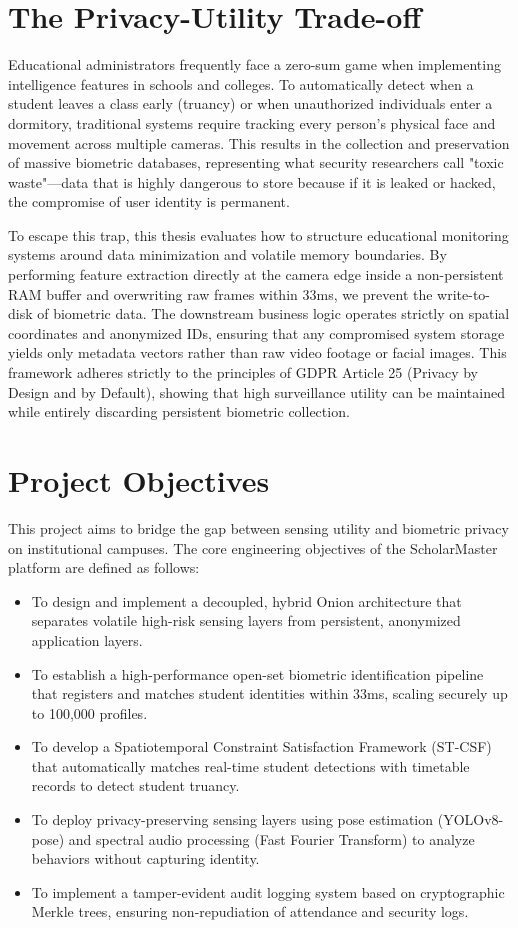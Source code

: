 \documentclass[12pt,a4paper,oneside]{report}
\begin{document}
\section{The Privacy-Utility Trade-off}
Educational administrators frequently face a zero-sum game when implementing intelligence features in schools and colleges. To automatically detect when a student leaves a class early (truancy) or when unauthorized individuals enter a dormitory, traditional systems require tracking every person's physical face and movement across multiple cameras. This results in the collection and preservation of massive biometric databases, representing what security researchers call "toxic waste"---data that is highly dangerous to store because if it is leaked or hacked, the compromise of user identity is permanent.

To escape this trap, this thesis evaluates how to structure educational monitoring systems around data minimization and volatile memory boundaries. By performing feature extraction directly at the camera edge inside a non-persistent RAM buffer and overwriting raw frames within 33ms, we prevent the write-to-disk of biometric data. The downstream business logic operates strictly on spatial coordinates and anonymized IDs, ensuring that any compromised system storage yields only metadata vectors rather than raw video footage or facial images. This framework adheres strictly to the principles of GDPR Article 25 (Privacy by Design and by Default), showing that high surveillance utility can be maintained while entirely discarding persistent biometric collection.

\section{Project Objectives}
This project aims to bridge the gap between sensing utility and biometric privacy on institutional campuses. The core engineering objectives of the ScholarMaster platform are defined as follows:
\begin{itemize}
    \item To design and implement a decoupled, hybrid Onion architecture that separates volatile high-risk sensing layers from persistent, anonymized application layers.
    \item To establish a high-performance open-set biometric identification pipeline that registers and matches student identities within 33ms, scaling securely up to 100,000 profiles.
    \item To develop a Spatiotemporal Constraint Satisfaction Framework (ST-CSF) that automatically matches real-time student detections with timetable records to detect student truancy.
    \item To deploy privacy-preserving sensing layers using pose estimation (YOLOv8-pose) and spectral audio processing (Fast Fourier Transform) to analyze behaviors without capturing identity.
    \item To implement a tamper-evident audit logging system based on cryptographic Merkle trees, ensuring non-repudiation of attendance and security logs.
\end{itemize}
\end{document}
